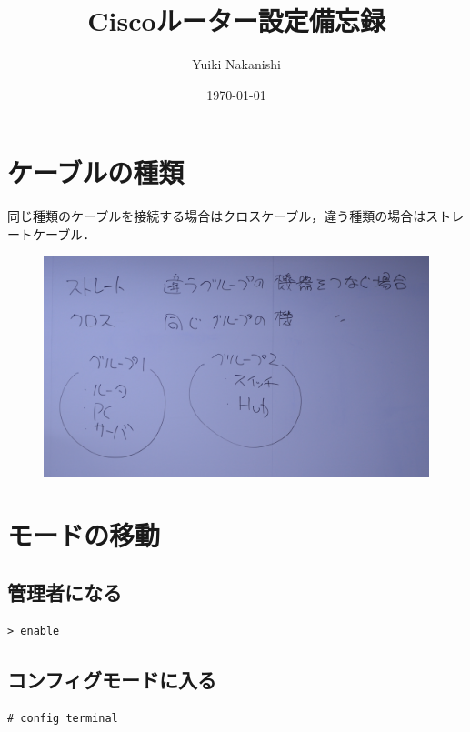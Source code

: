\documentclass[uplatex,dvipdfmx]{bxjsarticle}
\title{Ciscoルーター設定備忘録}
\author{Yuiki Nakanishi}
\date{\today}
\begin{document}
\maketitle

\section{ケーブルの種類}

同じ種類のケーブルを接続する場合はクロスケーブル，違う種類の場合はストレートケーブル．

\begin{figure}[htbp]
  \centering
  \includegraphics[width=1\linewidth]{figure/lan.JPG}
\end{figure}

\section{モードの移動}

\subsection{管理者になる}

\begin{lstlisting}[caption={管理者になる}]
> enable
\end{lstlisting}

\subsection{コンフィグモードに入る}

\begin{lstlisting}[caption={コンフィグモードに入る}]
# config terminal
\end{lstlisting}
\end{document}
